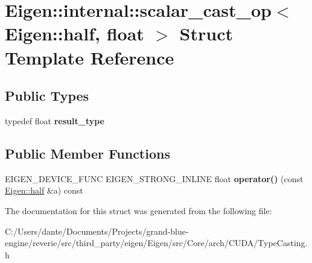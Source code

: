 \hypertarget{struct_eigen_1_1internal_1_1scalar__cast__op_3_01_eigen_1_1half_00_01float_01_4}{}\section{Eigen\+::internal\+::scalar\+\_\+cast\+\_\+op$<$ Eigen\+::half, float $>$ Struct Template Reference}
\label{struct_eigen_1_1internal_1_1scalar__cast__op_3_01_eigen_1_1half_00_01float_01_4}
\subsection*{Public Types}
\begin{DoxyCompactItemize}
\item 
\mbox{\label{struct_eigen_1_1internal_1_1scalar__cast__op_3_01_eigen_1_1half_00_01float_01_4_a63cd7345a22603c82b463187da5dc8d8}} 
typedef float {\bfseries result\+\_\+type}
\end{DoxyCompactItemize}
\subsection*{Public Member Functions}
\begin{DoxyCompactItemize}
\item 
\mbox{\label{struct_eigen_1_1internal_1_1scalar__cast__op_3_01_eigen_1_1half_00_01float_01_4_a67ac502cc060a4e7c23053e194327c69}} 
E\+I\+G\+E\+N\+\_\+\+D\+E\+V\+I\+C\+E\+\_\+\+F\+U\+NC E\+I\+G\+E\+N\+\_\+\+S\+T\+R\+O\+N\+G\+\_\+\+I\+N\+L\+I\+NE float {\bfseries operator()} (const \mbox{\hyperlink{struct_eigen_1_1half}{Eigen\+::half}} \&a) const
\end{DoxyCompactItemize}


The documentation for this struct was generated from the following file\+:\begin{DoxyCompactItemize}
\item 
C\+:/\+Users/dante/\+Documents/\+Projects/grand-\/blue-\/engine/reverie/src/third\+\_\+party/eigen/\+Eigen/src/\+Core/arch/\+C\+U\+D\+A/Type\+Casting.\+h\end{DoxyCompactItemize}
